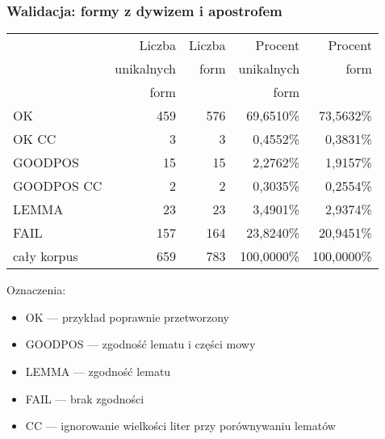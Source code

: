 \documentclass{beamer}
\begin{document}
\begin{frame}
\frametitle{Walidacja: formy z dywizem i apostrofem}
\begin{center}\begin{scriptsize}
\begin{tabular}{l|rrrr}
 & Liczba & Liczba & Procent & Procent\\
 & unikalnych & form & unikalnych & form\\
 & form & & form & \\
\hline
OK & 459 & 576 & 69,6510\% & 73,5632\% \\
OK CC & 3 & 3 & 0,4552\% & 0,3831\% \\
GOODPOS & 15 & 15 & 2,2762\% & 1,9157\% \\
GOODPOS CC & 2 & 2 & 0,3035\% & 0,2554\% \\
LEMMA & 23 & 23 & 3,4901\% & 2,9374\% \\
FAIL & 157 & 164 & 23,8240\% & 20,9451\% \\
\hline
cały korpus & 659 & 783 & 100,0000\% & 100,0000\%\\
\end{tabular}
\end{scriptsize}\end{center}
Oznaczenia:
\begin{itemize}
\item OK --- przykład poprawnie przetworzony
\item GOODPOS --- zgodność lematu i części mowy
\item LEMMA --- zgodność lematu
\item FAIL --- brak zgodności
\item CC --- ignorowanie wielkości liter przy porównywaniu lematów
\end{itemize}


\end{frame}
\end{document}
